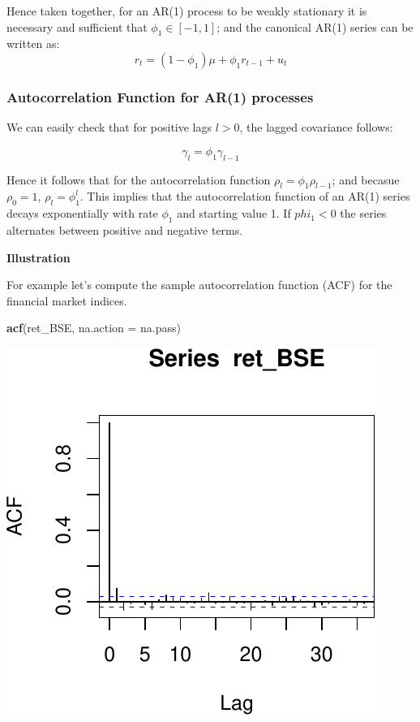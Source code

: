 \documentclass[11pt,]{article}
\newenvironment{Shaded}{\begin{snugshade}}{\end{snugshade}}
\newcommand{\KeywordTok}[1]{\textcolor[rgb]{0.13,0.29,0.53}{\textbf{#1}}}
\newcommand{\DataTypeTok}[1]{\textcolor[rgb]{0.13,0.29,0.53}{#1}}
\newcommand{\NormalTok}[1]{#1}
\begin{document}
Hence taken together, for an AR(1) process to be weakly stationary it is
necessary and sufficient that \(\phi_1\in[-1,1]\); and the canonical
AR(1) series can be written as: \[r_t=(1-\phi_1)\mu+\phi_1r_{t-1}+u_t\]

\subsubsection{Autocorrelation Function for AR(1)
processes}\label{autocorrelation-function-for-ar1-processes}

We can easily check that for positive lags \(l>0\), the lagged
covariance follows:

\[\gamma_l = \phi_1\gamma_{l-1}\]

Hence it follows that for the autocorrelation function
\(\rho_l = \phi_1\rho_{l-1}\); and becasue \(\rho_0=1\),
\(\rho_l = \phi_1^l\). This implies that the autocorrelation function of
an AR(1) series decays exponentially with rate \(\phi_1\) and starting
value 1. If \(phi_1<0\) the series alternates between positive and
negative terms.

\textbf{Illustration}

For example let's compute the sample autocorrelation function (ACF) for
the financial market indices.

\begin{Shaded}
\begin{Highlighting}[]
\KeywordTok{acf}\NormalTok{(ret_BSE, }\DataTypeTok{na.action =}\NormalTok{ na.pass)}
\end{Highlighting}
\end{Shaded}

\begin{center}\includegraphics{FMC_T4_PhD_ARMA_GARCH_files/figure-latex/sample_ACF-1} \end{center}
\end{document}
